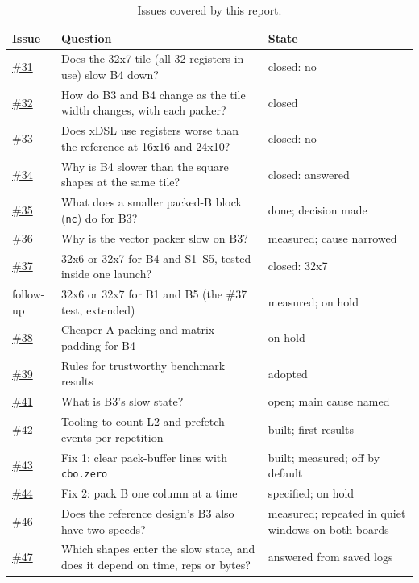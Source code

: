 \documentclass[11pt,a4paper]{article}
\newcommand{\iss}[1]{\href{https://github.com/JieGH/RVV_code_gen_via_MLIR_xDSL/issues/#1}{\##1}}
\begin{document}
\begin{table}[h]
\centering\small
\begin{tabularx}{\linewidth}{@{}l X l@{}}
\toprule
\textbf{Issue} & \textbf{Question} & \textbf{State} \\
\midrule
\iss{31} & Does the 32x7 tile (all 32 registers in use) slow B4 down? & closed: no \\
\iss{32} & How do B3 and B4 change as the tile width changes, with each packer? & closed \\
\iss{33} & Does xDSL use registers worse than the reference at 16x16 and 24x10? & closed: no \\
\iss{34} & Why is B4 slower than the square shapes at the same tile? & closed: answered \\
\iss{35} & What does a smaller packed-B block (\texttt{nc}) do for B3? & done; decision made \\
\iss{36} & Why is the vector packer slow on B3? & measured; cause narrowed \\
\iss{37} & 32x6 or 32x7 for B4 and S1--S5, tested inside one launch? & closed: 32x7 \\
follow-up & 32x6 or 32x7 for B1 and B5 (the \#37 test, extended) & measured; on hold \\
\iss{38} & Cheaper A packing and matrix padding for B4 & on hold \\
\iss{39} & Rules for trustworthy benchmark results & adopted \\
\iss{41} & What is B3's slow state? & open; main cause named \\
\iss{42} & Tooling to count L2 and prefetch events per repetition & built; first results \\
\iss{43} & Fix 1: clear pack-buffer lines with \texttt{cbo.zero} & built; measured; off by default \\
\iss{44} & Fix 2: pack B one column at a time & specified; on hold \\
\iss{46} & Does the reference design's B3 also have two speeds? & measured; repeated in quiet windows on both boards \\
\iss{47} & Which shapes enter the slow state, and does it depend on time, reps or bytes? & answered from saved logs \\
\bottomrule
\end{tabularx}
\caption{Issues covered by this report.}
\label{tab:issues}
\end{table}
\end{document}
